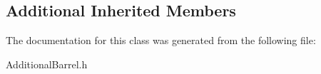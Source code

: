 \subsection*{Additional Inherited Members}


The documentation for this class was generated from the following file\+:\begin{DoxyCompactItemize}
\item 
Additional\+Barrel.\+h\end{DoxyCompactItemize}

